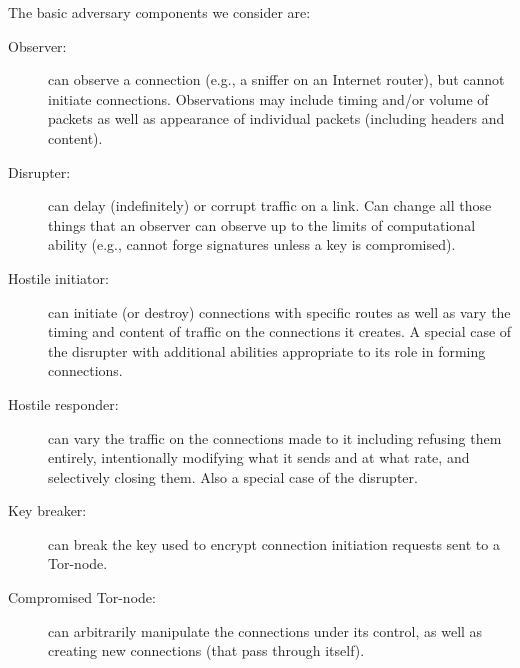\documentclass[times,10pt,twocolumn]{article}
\begin{document}
The basic adversary components we consider are:
\begin{description}
\item[Observer:] can observe a connection (e.g., a sniffer on an
  Internet router), but cannot initiate connections. Observations may
  include timing and/or volume of packets as well as appearance of
  individual packets (including headers and content).
\item[Disrupter:] can delay (indefinitely) or corrupt traffic on a
  link. Can change all those things that an observer can observe up to
  the limits of computational ability (e.g., cannot forge signatures
  unless a key is compromised).
\item[Hostile initiator:] can initiate (or destroy) connections with
  specific routes as well as vary the timing and content of traffic
  on the connections it creates. A special case of the disrupter with
  additional abilities appropriate to its role in forming connections.
\item[Hostile responder:] can vary the traffic on the connections made
  to it including refusing them entirely, intentionally modifying what
  it sends and at what rate, and selectively closing them. Also a
  special case of the disrupter.
\item[Key breaker:] can break the key used to encrypt connection
  initiation requests sent to a Tor-node.
%

  
\item[Compromised Tor-node:] can arbitrarily manipulate the
  connections under its control, as well as creating new connections
  (that pass through itself).
\end{description}
\end{document}
